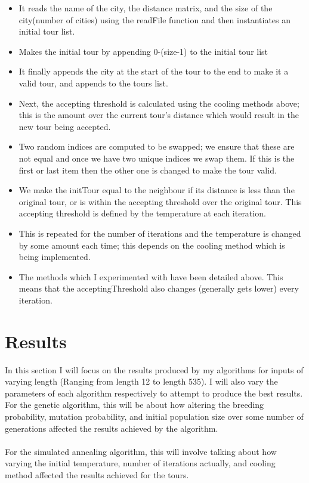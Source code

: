 \documentclass{article}
\begin{document}
\begin{itemize}
	\item It reads the name of the city, the distance matrix, and the size of the city(number of cities) using the readFile function and then instantiates an initial tour list.
	\item Makes the initial tour by appending 0-(size-1) to the initial tour list
	\item It finally appends the city at the start of the tour to the end to make it a valid tour, and appends to the tours list.
	\item Next, the accepting threshold is calculated using the cooling methods above; this is the amount over the current tour's distance which would result in the new tour being accepted.
	\item Two random indices are computed to be swapped; we ensure that these are not equal and once we have two unique indices we swap them. If this is the first or last item then the other one is changed to make the tour valid.
	\item We make the initTour equal to the neighbour if its distance is less than the original tour, or is within the accepting threshold over the original tour. This accepting threshold is defined by the temperature at each iteration.
	\item This is repeated for the number of iterations and the temperature is changed by some amount each time; this depends on the cooling method which is being implemented. 
	\item The methods which I experimented with have been detailed above. This means that the acceptingThreshold also changes (generally gets lower) every iteration.
\end{itemize}
\section{Results}
In this section I will focus on the results produced by my algorithms for inputs of varying length (Ranging from length 12 to length 535). I will also vary the parameters of each algorithm respectively to attempt to produce the best results. For the genetic algorithm, this will be about how altering the breeding probability, mutation probability, and initial population size over some number of generations affected the results achieved by the algorithm. \\\\
For the simulated annealing algorithm, this will involve talking about how varying the initial temperature, number of iterations actually, and cooling method affected the results achieved for the tours. \\
\end{document}
